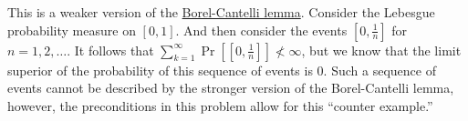 \begin{problem}{12}
\end{problem}
\begin{solution}
    
\end{solution}
\begin{problem}{13}
\end{problem}
\begin{solution}
    
\end{solution}
\begin{problem}{14}    
\end{problem}
\begin{solution}
    This is a weaker version of the \href{https://en.wikipedia.org/wiki/Borel-Cantelli_lemma}{Borel-Cantelli lemma}. Consider the Lebesgue probability measure on $[0,1]$. And then consider the events $\left[0,\frac{1}{n}\right]$ for $n = 1,2,\ldots$. It follows that $\sum_{k=1}^\infty \Pr\left[\left[0,\frac{1}{n}\right]\right] \not < \infty$, but we know that the limit superior of the probability of this sequence of events is 0. Such a sequence of events cannot be described by the stronger version of the Borel-Cantelli lemma, however, the preconditions in this problem allow for this ``counter example.''


\end{solution}
